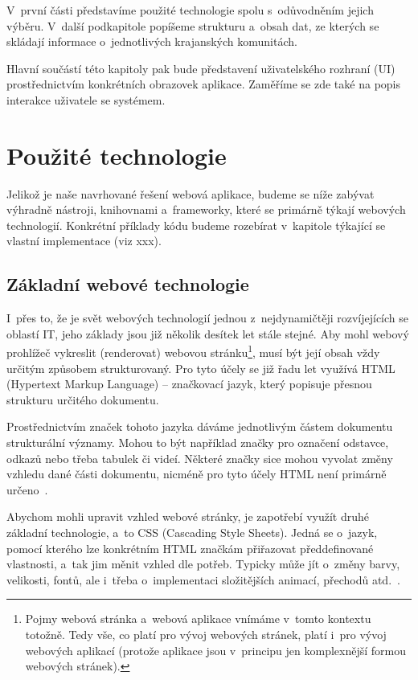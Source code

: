 V~první části představíme použité technologie spolu s~odůvodněním jejich výběru. V~další podkapitole popíšeme strukturu a~obsah dat, ze kterých se skládají informace o~jednotlivých krajanských komunitách.

Hlavní součástí této kapitoly pak bude představení uživatelského rozhraní (UI) prostřednictvím konkrétních obrazovek aplikace. Zaměříme se zde také na popis interakce uživatele se systémem.

\hypertarget{pouux17eituxe9-technologie}{%
\section{Použité technologie}\label{pouux17eituxe9-technologie}}

Jelikož je naše navrhované řešení webová aplikace, budeme se níže zabývat výhradně nástroji, knihovnami a~frameworky, které se primárně týkají webových technologií. Konkrétní příklady kódu budeme rozebírat v~kapitole týkající se vlastní implementace (viz xxx).

\hypertarget{zuxe1kladnuxed-webovuxe9-technologie}{%
\subsection{Základní webové technologie}\label{zuxe1kladnuxed-webovuxe9-technologie}}

I~přes to, že je svět webových technologií jednou z~nejdynamičtěji rozvíjejících se oblastí IT, jeho základy jsou již několik desítek let stále stejné. Aby mohl webový prohlížeč vykreslit (renderovat) webovou stránku\footnote{Pojmy webová stránka a~webová aplikace vnímáme v~tomto kontextu totožně. Tedy vše, co platí pro vývoj webových stránek, platí i~pro vývoj webových aplikací (protože aplikace jsou v~principu jen komplexnější formou webových stránek).}, musí být její obsah vždy určitým způsobem strukturovaný. Pro tyto účely se již řadu let využívá HTML (Hypertext Markup Language) -- značkovací jazyk, který popisuje přesnou strukturu určitého dokumentu.

Prostřednictvím značek tohoto jazyka dáváme jednotlivým částem dokumentu strukturální významy. Mohou to být například značky pro označení odstavce, odkazů nebo třeba tabulek či videí. Některé značky sice mohou vyvolat změny vzhledu dané části dokumentu, nicméně pro tyto účely HTML není primárně určeno~\parencite{htmlcss}.

Abychom mohli upravit vzhled webové stránky, je zapotřebí využít druhé základní technologie, a~to CSS (Cascading Style Sheets). Jedná se o~jazyk, pomocí kterého lze konkrétním HTML značkám přiřazovat předdefinované vlastnosti, a~tak jim měnit vzhled dle potřeb. Typicky může jít o~změny barvy, velikosti, fontů, ale i~třeba o~implementaci složitějších animací, přechodů atd.~\parencite{htmlcss}.

